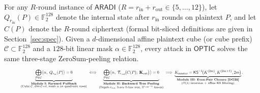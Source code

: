 \documentclass[11pt,a4paper]{article}
\theoremstyle{definition}
\theoremstyle{remark}
\newcommand{\Ftwo}{\mathbb{F}_2}
\newcommand{\ARADI}{\mathsf{ARADI}}
\newcommand{\OPTIC}{\mathsf{OPTIC}}
\begin{document}
For any $R$-round instance of $\ARADI$ ($R = r_{\text{in}} + r_{\text{out}} \in \{5, \dots, 12\}$), let $Q_{r_{\text{in}}}(P) \in \Ftwo^{128}$ denote the internal state after $r_{\text{in}}$ rounds on plaintext $P$, and let $C(P)$ denote the $R$-round ciphertext (formal bit-sliced definitions are given in Section~\ref{sec:spec}). Given a $d$-dimensional affine plaintext cube (or cube prefix) $\mathcal{C} \subset \Ftwo^{128}$ and a $128$-bit linear mask $\alpha \in \Ftwo^{128}$, every attack in $\OPTIC$ solves the same three-stage ZeroSum-peeling relation.
\begin{equation}
\label{eq:master-optic}
\resizebox{0.91\textwidth}{!}{$\displaystyle
\underbrace{\bigoplus_{P \in \mathcal{C}} \bigl\langle \alpha,\; Q_{r_{\text{in}}}(P) \bigr\rangle = 0}_{\substack{\textbf{Module I: Forward Pullback}\\(\text{Cube }\mathcal{C},\;\dim\mathcal{C}=d,\;\text{mask }\alpha\text{ on quadratic rows})}}
\;\Longleftrightarrow\;
\underbrace{\bigoplus_{P \in \mathcal{C}} \bigl\langle \alpha,\; \mathcal{T}_{r_{\text{out}}}\!\bigl(C(P);\; \mathbf{K}_{\text{out}}\bigr) \bigr\rangle = 0}_{\substack{\textbf{Module II: Backward Tree Peeling}\\(\text{Depth-}r_{\text{out}}\text{ 3-ary S-box tree},\;3^{r_{\text{out}}-1}\text{ leaves})}}
\;\Longrightarrow\;
\underbrace{K_{\text{master}} = \mathsf{KS}^{-1}\!\bigl(K^{(2m)}, K^{(2m+1)}, 2m\bigr)}_{\substack{\textbf{Module III: Even-Pair Closure~\cite[Remark~5]{DG25}}\\(O(1)\text{ inversion }+\text{ affine KS filtering})}}.$}
\end{equation}
\end{document}
